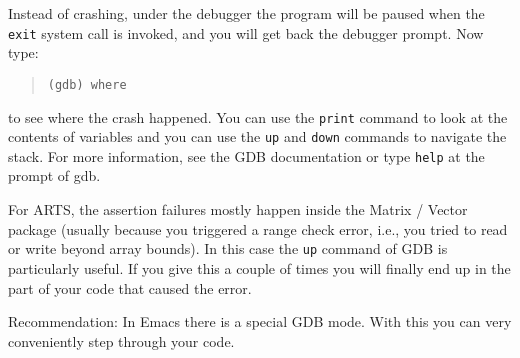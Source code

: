Instead of crashing, under the debugger the program will be paused
when the \verb|exit| system call is invoked, and you will get back the
debugger prompt. Now type:
\begin{quote}
  \verb|(gdb) where| 
\end{quote}  
to see where the crash happened. You can use the \verb|print| command to
look at the contents of variables and you can use the \verb|up| and \verb|down|
commands to navigate the stack. For more information, see the GDB
documentation or type \verb|help| at the prompt of gdb.

For ARTS, the assertion failures mostly happen inside the Matrix /
Vector package (usually because you triggered a range check error,
i.e., you tried to read or write beyond array bounds). In this case the
\verb|up| command of GDB is particularly useful. If you give this a
couple of times you will finally end up in the part of your code that
caused the error.

Recommendation: In Emacs there is a special GDB mode. With this you
can very conveniently step through your code.




